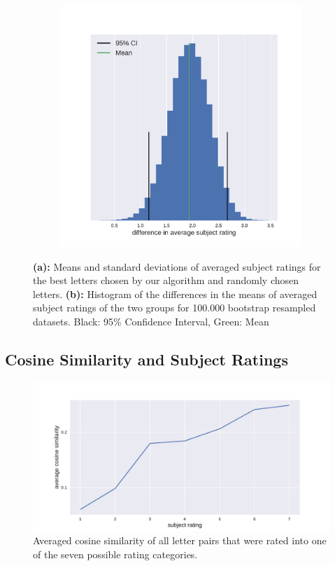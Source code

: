 \begin{figure}
\begin{subfigure}[b]{0.33\textwidth}
	\end{subfigure}
	\hfill
	\begin{subfigure}[b]{0.66\textwidth}
		\includegraphics[width=\textwidth, valign=t]{figures/mean_diff_best_random}
		\caption{}
		\label{fig:bootstrap_diff}
	\end{subfigure}
	\caption{\textbf{(a):} Means and standard deviations of averaged subject ratings for the best letters chosen by our algorithm and randomly chosen letters.
		\textbf{(b):} Histogram of the differences in the means of averaged subject ratings of the two groups for 100.000 bootstrap resampled datasets. Black: 95\% Confidence Interval, Green: Mean}	
\end{figure}

\subsection*{Cosine Similarity and Subject Ratings}
\begin{figure}
	\includegraphics[width=\linewidth]{figures/rating_vs_sim_mean}
	\caption{Averaged cosine similarity of all letter pairs that were rated into one of the seven possible rating categories.}
	\label{fig:rating_vs_sim}
\end{figure}



